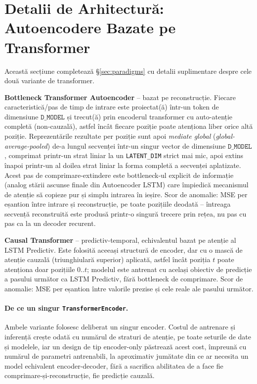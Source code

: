 \section{Detalii de Arhitectură: Autoencodere Bazate pe Transformer}
\label{sec:transformer-architecture-details}

Această secțiune completează \S\ref{sec:paradigms} cu detalii suplimentare despre cele două variante de transformer.

\textbf{Bottleneck Transformer Autoencoder} -- bazat pe reconstrucție. Fiecare caracteristică/pas de timp de intrare este proiectat(ă) într-un token de dimensiune $\texttt{D\_MODEL}$ și trecut(ă) prin encoderul transformer cu auto-atenție completă (non-cauzală), astfel încât fiecare poziție poate atenționa liber orice altă poziție. Reprezentările rezultate per poziție sunt apoi \emph{mediate global} (\emph{global-average-pooled}) de-a lungul secvenței într-un singur vector de dimensiune $\texttt{D\_MODEL}$, comprimat printr-un strat liniar la un \texttt{LATENT\_DIM} strict mai mic, apoi extins înapoi printr-un al doilea strat liniar la forma completă a secvenței aplatizate.
Acest pas de comprimare-extindere este bottleneck-ul explicit de informație (analog stării ascunse finale din Autoencoder LSTM) care împiedică mecanismul de atenție să copieze pur și simplu intrarea în ieșire.
Scor de anomalie: MSE per eșantion între intrare și reconstrucție, pe toate pozițiile deodată -- întreaga secvență reconstruită este produsă printr-o singură trecere prin rețea, nu pas cu pas ca la un decoder recurent.

\textbf{Causal Transformer} -- predictiv-temporal, echivalentul bazat pe atenție al LSTM Predictiv. Este folosită aceeași structură de encoder, dar cu o mască de atenție cauzală (triunghiulară superior) aplicată, astfel încât poziția $t$ poate atenționa doar pozițiile $0..t$; modelul este antrenat cu același obiectiv de predicție a pasului următor ca LSTM Predictiv, fără bottleneck de comprimare.
Scor de anomalie: MSE per eșantion între valorile prezise și cele reale ale pasului următor.

\paragraph{De ce un singur \texttt{TransformerEncoder}.} Ambele variante folosesc deliberat un singur encoder. Costul de antrenare și inferență crește odată cu numărul de straturi de atenție, pe toate seturile de date și modelele, iar un design de tip encoder-only păstrează acest cost, împreună cu numărul de parametri antrenabili, la aproximativ jumătate din ce ar necesita un model echivalent encoder-decoder, fără a sacrifica abilitatea de a face fie comprimare-și-reconstrucție, fie predicție cauzală.

